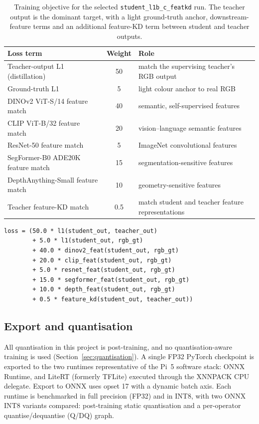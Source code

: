 \begin{table}[!htbp]
\centering
\footnotesize
\begin{tabular}{lcl}
\hline
\textbf{Loss term} & \textbf{Weight} & \textbf{Role} \\
\hline
Teacher-output L1 (distillation) & 50 & match the supervising teacher's RGB output \\
Ground-truth L1 & 5 & light colour anchor to real RGB \\
DINOv2 ViT-S/14 feature match & 40 & semantic, self-supervised features \\
CLIP ViT-B/32 feature match & 20 & vision--language semantic features \\
ResNet-50 feature match & 5 & ImageNet convolutional features \\
SegFormer-B0 ADE20K feature match & 15 & segmentation-sensitive features \\
DepthAnything-Small feature match & 10 & geometry-sensitive features \\
Teacher feature-KD match & 0.5 & match student and teacher feature representations \\
\hline
\end{tabular}
\caption{Training objective for the selected \texttt{student\_l1b\_c\_featkd} run. The teacher output is the dominant target, with a light ground-truth anchor, downstream-feature terms and an additional feature-KD term between student and teacher outputs.}
\label{tab:student_loss}
\end{table}

\begin{lstlisting}[caption={The student distillation objective: a dominant teacher-output L1 term, a light ground-truth anchor, and DINOv2/CLIP feature-matching terms.}, label={lst:distill}]
loss = (50.0 * l1(student_out, teacher_out)
        + 5.0 * l1(student_out, rgb_gt)
        + 40.0 * dinov2_feat(student_out, rgb_gt)
        + 20.0 * clip_feat(student_out, rgb_gt)
        + 5.0 * resnet_feat(student_out, rgb_gt)
        + 15.0 * segformer_feat(student_out, rgb_gt)
        + 10.0 * depth_feat(student_out, rgb_gt)
        + 0.5 * feature_kd(student_out, teacher_out))
\end{lstlisting}

\subsection{Export and quantisation}
\label{sec:impl_export}

All quantisation in this project is post-training, and no quantisation-aware training is used (Section~\ref{sec:quantisation}). A single FP32 PyTorch checkpoint is exported to the two runtimes representative of the Pi~5 software stack: ONNX Runtime, and LiteRT (formerly TFLite) executed through the XNNPACK CPU delegate. Export to ONNX uses opset 17 with a dynamic batch axis. Each runtime is benchmarked in full precision (FP32) and in INT8, with two ONNX INT8 variants compared: post-training static quantisation and a per-operator quantise/dequantise (Q/DQ) graph.

